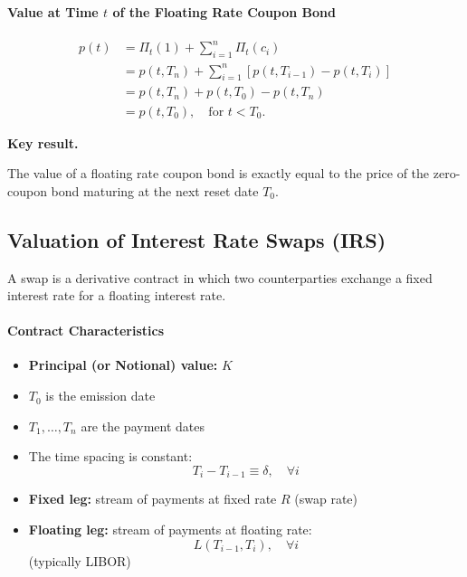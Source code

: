 \documentclass[12pt,a4paper]{article}
\theoremstyle{definition}
\begin{document}
\paragraph{Value at Time $t$ of the Floating Rate Coupon Bond}

\begin{align*}
p(t) &= \Pi_t(1) + \sum_{i=1}^n \Pi_t(c_i) \\
&= p(t, T_n) + \sum_{i=1}^n [p(t, T_{i-1}) - p(t, T_i)] \\
&= p(t, T_n) + p(t, T_0) - p(t, T_n) \\
&= p(t, T_0), \quad \text{for } t < T_0.
\end{align*}

\textbf{Key result.}

The value of a floating rate coupon bond is exactly equal to the price of the zero-coupon bond maturing at the next reset date $T_0$.

\subsection{Valuation of Interest Rate Swaps (IRS)}

A swap is a derivative contract in which two counterparties exchange a fixed interest rate for a floating interest rate.

\paragraph{Contract Characteristics}

\begin{itemize}
\item \textbf{Principal (or Notional) value:} $K$

\item $T_0$ is the emission date

\item $T_1, \ldots, T_n$ are the payment dates

\item The time spacing is constant:
\[
T_i - T_{i-1} \equiv \delta, \quad \forall i
\]

\item \textbf{Fixed leg:} stream of payments at fixed rate $R$ (swap rate)

\item \textbf{Floating leg:} stream of payments at floating rate:
\[
L(T_{i-1}, T_i), \quad \forall i
\]
(typically LIBOR)
\end{itemize}
\end{document}
